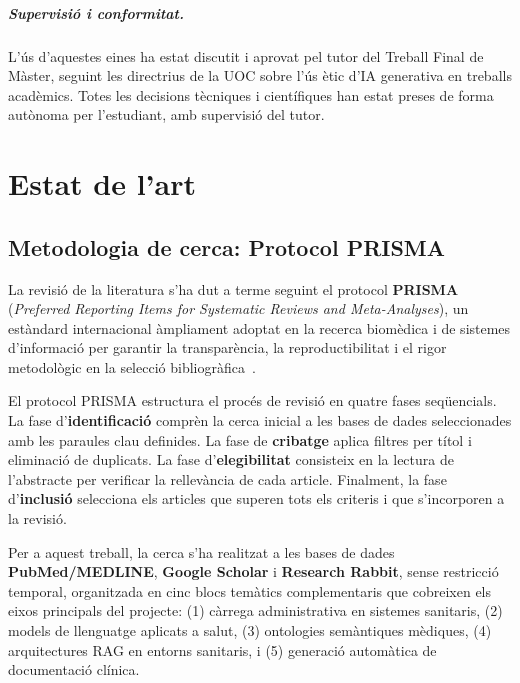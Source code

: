\documentclass[CAT]{TFUOC}%
\begin{document}
\paragraph{Supervisió i conformitat.}
L'ús d'aquestes eines ha estat discutit i aprovat pel tutor del Treball Final de Màster, seguint les directrius de la UOC sobre l'ús ètic d'IA generativa en treballs acadèmics. Totes les decisions tècniques i científiques han estat preses de forma autònoma per l'estudiant, amb supervisió del tutor.



\chapter{Estat de l'art}

\section{Metodologia de cerca: Protocol PRISMA}

La revisió de la literatura s'ha dut a terme seguint el protocol \textbf{PRISMA} (\textit{Preferred Reporting Items for Systematic Reviews and Meta-Analyses}), un estàndard internacional àmpliament adoptat en la recerca biomèdica i de sistemes d'informació per garantir la transparència, la reproductibilitat i el rigor metodològic en la selecció bibliogràfica~\cite{page2021prisma}.

El protocol PRISMA estructura el procés de revisió en quatre fases seqüencials. La fase d'\textbf{identificació} comprèn la cerca inicial a les bases de dades seleccionades amb les paraules clau definides. La fase de \textbf{cribatge} aplica filtres per títol i eliminació de duplicats. La fase d'\textbf{elegibilitat} consisteix en la lectura de l'abstracte per verificar la rellevància de cada article. Finalment, la fase d'\textbf{inclusió} selecciona els articles que superen tots els criteris i que s'incorporen a la revisió.

Per a aquest treball, la cerca s'ha realitzat a les bases de dades \textbf{PubMed/MEDLINE}, \textbf{Google Scholar} i \textbf{Research Rabbit}, sense restricció temporal, organitzada en cinc blocs temàtics complementaris que cobreixen els eixos principals del projecte: (1) càrrega administrativa en sistemes sanitaris, (2) models de llenguatge aplicats a salut, (3) ontologies semàntiques mèdiques, (4) arquitectures RAG en entorns sanitaris, i (5) generació automàtica de documentació clínica.
\end{document}
